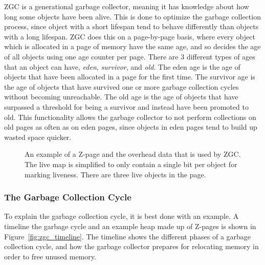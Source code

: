 \begin{description}
        ZGC is a generational garbage collector, meaning it has knowledge about how long some objects have been alive. This is done to optimize the garbage collection process, since object with a short lifespan tend to behave differently than objects with a long lifespan. ZGC does this on a page-by-page basis, where every object which is allocated in a page of memory have the same age, and so decides the age of all objects using one age counter per page. There are 3 different types of ages that an object can have, \textit{eden}, \textit{survivor}, and \textit{old}. The eden age is the age of objects that have been allocated in a page for the first time. The survivor age is the age of objects that have survived one or more garbage collection cycles without becoming unreachable. The old age is the age of objects that have surpassed a threshold for being a survivor and instead have been promoted to old. This functionality allows the garbage collector to not perform collections on old pages as often as on eden pages, since objects in eden pages tend to build up wasted space quicker.
\end{description}

\begin{figure}[H]
    \centering
    
    \caption[]
    {An example of a Z-page and the overhead data that is used by ZGC. The live map is simplified to only contain a single bit per object for marking liveness. There are three live objects in the page.} 
    \label{fig:zpages}
\end{figure}

\subsubsection{The Garbage Collection Cycle}
To explain the garbage collection cycle, it is best done with an example. A timeline the garbage cycle and an example heap made up of Z-pages is shown in Figure~\ref{fig:zgc_timeline}. The timeline shows the different phases of a garbage collection cycle, and how the garbage collector prepares for relocating memory in order to free unused memory.


